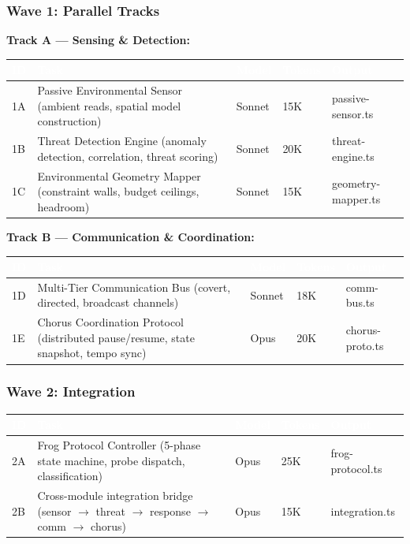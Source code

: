 \documentclass[11pt,letterpaper]{article}
\newcommand{\tableheader}[1]{\textbf{\sffamily\textcolor{white}{#1}}}
\begin{document}
\subsubsection{Wave 1: Parallel Tracks}

\textbf{Track A --- Sensing \& Detection:}

\begin{center}
\begin{tabularx}{\textwidth}{C{0.8cm}L{3.5cm}L{1.5cm}C{1.2cm}X}
\toprule
{}
\tableheader{ID} & \tableheader{Task} & \tableheader{Model} & \tableheader{Tokens} & \tableheader{Output} \\
\midrule
1A & Passive Environmental Sensor (ambient reads, spatial model construction) & Sonnet & 15K & passive-sensor.ts \\
1B & Threat Detection Engine (anomaly detection, correlation, threat scoring) & Sonnet & 20K & threat-engine.ts \\
1C & Environmental Geometry Mapper (constraint walls, budget ceilings, headroom) & Sonnet & 15K & geometry-mapper.ts \\
\bottomrule
\end{tabularx}
\end{center}

\textbf{Track B --- Communication \& Coordination:}

\begin{center}
\begin{tabularx}{\textwidth}{C{0.8cm}L{3.5cm}L{1.5cm}C{1.2cm}X}
\toprule
{}
\tableheader{ID} & \tableheader{Task} & \tableheader{Model} & \tableheader{Tokens} & \tableheader{Output} \\
\midrule
1D & Multi-Tier Communication Bus (covert, directed, broadcast channels) & Sonnet & 18K & comm-bus.ts \\
1E & Chorus Coordination Protocol (distributed pause/resume, state snapshot, tempo sync) & Opus & 20K & chorus-proto.ts \\
\bottomrule
\end{tabularx}
\end{center}

\subsubsection{Wave 2: Integration}

\begin{center}
\begin{tabularx}{\textwidth}{C{0.8cm}L{3.5cm}L{1.5cm}C{1.2cm}X}
\toprule
{}
\tableheader{ID} & \tableheader{Task} & \tableheader{Model} & \tableheader{Tokens} & \tableheader{Output} \\
\midrule
2A & Frog Protocol Controller (5-phase state machine, probe dispatch, classification) & Opus & 25K & frog-protocol.ts \\
2B & Cross-module integration bridge (sensor $\to$ threat $\to$ response $\to$ comm $\to$ chorus) & Opus & 15K & integration.ts \\
\bottomrule
\end{tabularx}
\end{center}
\end{document}
